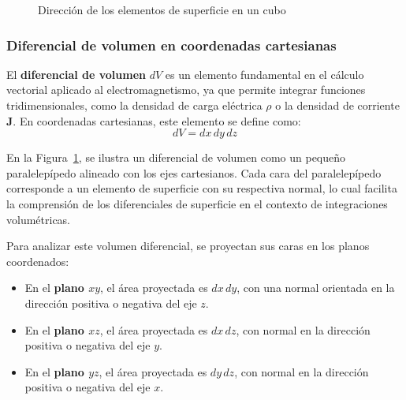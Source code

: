 \documentclass{book}
\begin{document}
\begin{figure}[h!]
    \caption{Dirección de los elementos de superficie en un cubo}
    \label{fig:diferencial_volumen_cartesiana}
\end{figure}
\subsubsection{Diferencial de volumen en coordenadas cartesianas}

El \textbf{diferencial de volumen} $dV$ es un elemento fundamental en el cálculo vectorial aplicado al electromagnetismo, ya que permite integrar funciones tridimensionales, como la densidad de carga eléctrica $\rho$ o la densidad de corriente $\mathbf{J}$. En coordenadas cartesianas, este elemento se define como:
\begin{equation}
dV = dx\,dy\,dz
\end{equation}

En la Figura~\ref{fig:diferencial_volumen_cartesiana}, se ilustra un diferencial de volumen como un pequeño paralelepípedo alineado con los ejes cartesianos. Cada cara del paralelepípedo corresponde a un elemento de superficie con su respectiva normal, lo cual facilita la comprensión de los diferenciales de superficie en el contexto de integraciones volumétricas.

Para analizar este volumen diferencial, se proyectan sus caras en los planos coordenados:
\begin{itemize}
    \item En el \textbf{plano $xy$}, el área proyectada es $dx\,dy$, con una normal orientada en la dirección positiva o negativa del eje $z$.
    \item En el \textbf{plano $xz$}, el área proyectada es $dx\,dz$, con normal en la dirección positiva o negativa del eje $y$.
    \item En el \textbf{plano $yz$}, el área proyectada es $dy\,dz$, con normal en la dirección positiva o negativa del eje $x$.
\end{itemize}
\end{document}
